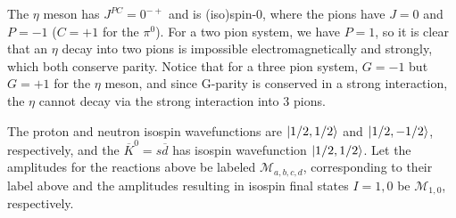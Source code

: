 
The $\eta$ meson has $J^{PC} = 0^{-+}$ and is (iso)spin-0, where the pions have $J = 0$ and $P = -1$ ($C = +1$ for the $\pi^{0}$).
For a two pion system, we have $P = 1$, so it is clear that an $\eta$ decay into two pions is impossible electromagnetically and strongly, which both conserve parity.
Notice that for a three pion system, $G = -1$ but $G = +1$ for the $\eta$ meson, and since G-parity is conserved in a strong interaction, the $\eta$ cannot decay via the strong interaction into $3$ pions.




The proton and neutron isospin wavefunctions are $\ket{1/2,1/2}$ and $\ket{1/2,-1/2}$, respectively, and the $\overline{K}^{0} = s\overline{d}$ has isospin wavefunction $\ket{1/2,1/2}$.
Let the amplitudes for the reactions above be labeled $\mathcal{M}_{a,b,c,d}$, corresponding to their label above and the amplitudes resulting in isospin final states $I = 1,0$ be $\mathcal{M}_{1,0}$, respectively.

